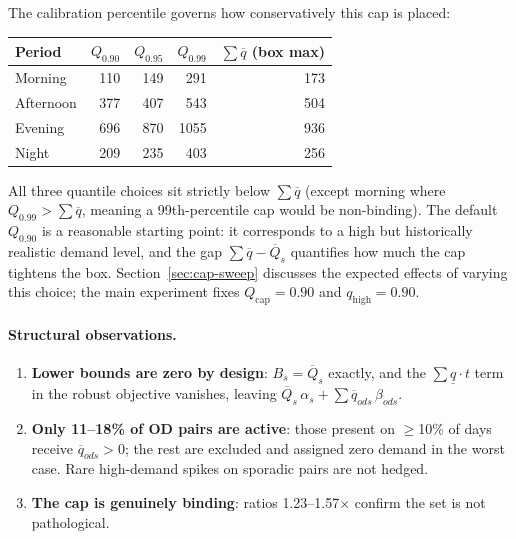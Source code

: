\documentclass[11pt]{article}
\theoremstyle{definition}
\begin{document}
The calibration percentile governs how conservatively this cap is placed:

\begin{center}
	\begin{tabular}{lrrrr}
		\toprule
		Period    & $Q_{0.90}$ & $Q_{0.95}$ & $Q_{0.99}$ & $\sum\overline{q}$ (box max) \\
		\midrule
		Morning   & 110        & 149        & 291        & 173                          \\
		Afternoon & 377        & 407        & 543        & 504                          \\
		Evening   & 696        & 870        & 1055       & 936                          \\
		Night     & 209        & 235        & 403        & 256                          \\
		\bottomrule
	\end{tabular}
\end{center}

All three quantile choices sit strictly below $\sum\overline{q}$ (except morning
where $Q_{0.99} > \sum\overline{q}$, meaning a 99th-percentile cap would be
non-binding).  The default $Q_{0.90}$ is a reasonable starting point: it
corresponds to a high but historically realistic demand level, and the gap
$\sum\overline{q} - \overline{Q}_s$ quantifies how much the cap tightens the
box.  Section~\ref{sec:cap-sweep} discusses the expected effects of varying
this choice; the main experiment fixes $Q_{\mathrm{cap}} = 0.90$ and
$q_{\mathrm{high}} = 0.90$.

\paragraph{Structural observations.}
\begin{enumerate}
	\item \textbf{Lower bounds are zero by design}: $B_s = \overline{Q}_s$ exactly,
	      and the $\sum\underline{q}\cdot t$ term in the robust objective vanishes,
	      leaving $\overline{Q}_s\,\alpha_s + \sum\overline{q}_{ods}\,\beta_{ods}$.

	\item \textbf{Only 11--18\% of OD pairs are active}: those present on
	      $\ge$10\% of days receive $\overline{q}_{ods} > 0$; the rest are excluded
	      and assigned zero demand in the worst case.  Rare high-demand spikes on
	      sporadic pairs are not hedged.

	\item \textbf{The cap is genuinely binding}: ratios 1.23--1.57$\times$
	      confirm the set is not pathological.
\end{enumerate}
\end{document}
